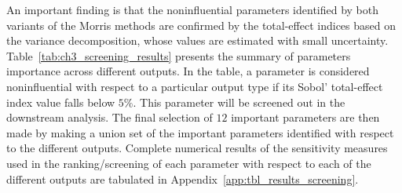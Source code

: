 An important finding is that the noninfluential parameters identified by both variants of the Morris methods are confirmed by the total-effect indices based on the variance decomposition, whose values are estimated with small uncertainty.
Table~\ref{tab:ch3_screening_results} presents the summary of parameters importance across different outputs.
In the table, a parameter is considered noninfluential with respect to a particular output type if its Sobol' total-effect index value falls below $5\%$.
This parameter will be screened out in the downstream analysis.
The final selection of $12$ important parameters are then made by making a union set of the important parameters identified with respect to the different outputs.
Complete numerical results of the sensitivity measures used in the ranking/screening of each parameter with respect to each of the different outputs are tabulated in Appendix~\ref{app:tbl_results_screening}.
